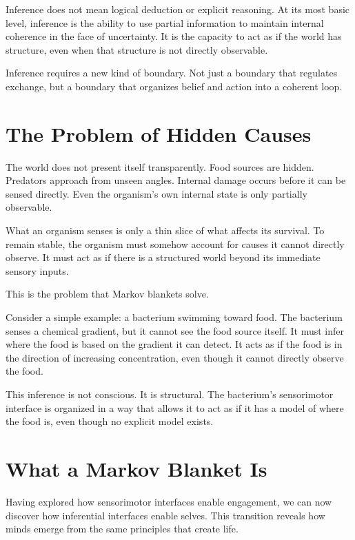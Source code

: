\documentclass[
  openright]{book}
\begin{document}
Inference does not mean logical deduction or explicit reasoning. At its
most basic level, inference is the ability to use partial information to
maintain internal coherence in the face of uncertainty. It is the
capacity to act as if the world has structure, even when that structure
is not directly observable.

Inference requires a new kind of boundary. Not just a boundary that
regulates exchange, but a boundary that organizes belief and action into
a coherent loop.

\section{The Problem of Hidden
Causes}\label{the-problem-of-hidden-causes}

The world does not present itself transparently. Food sources are
hidden. Predators approach from unseen angles. Internal damage occurs
before it can be sensed directly. Even the organism's own internal state
is only partially observable.

What an organism senses is only a thin slice of what affects its
survival. To remain stable, the organism must somehow account for causes
it cannot directly observe. It must act as if there is a structured
world beyond its immediate sensory inputs.

This is the problem that Markov blankets solve.

Consider a simple example: a bacterium swimming toward food. The
bacterium senses a chemical gradient, but it cannot see the food source
itself. It must infer where the food is based on the gradient it can
detect. It acts as if the food is in the direction of increasing
concentration, even though it cannot directly observe the food.

This inference is not conscious. It is structural. The bacterium's
sensorimotor interface is organized in a way that allows it to act as if
it has a model of where the food is, even though no explicit model
exists.

\section{What a Markov Blanket Is}\label{what-a-markov-blanket-is}

Having explored how sensorimotor interfaces enable engagement, we can
now discover how inferential interfaces enable selves. This transition
reveals how minds emerge from the same principles that create life.
\end{document}

